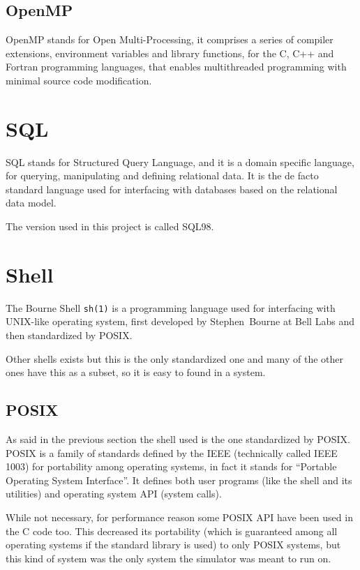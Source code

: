 \documentclass[Lau]{sapthesis} %
\let\oldsection\section
\let\oldsubsection\subsection
\def\subsubsection{\oldsubsection}
\def\subsection{\oldsection}
\def\section{\chapter}
\begin{document}
\subsubsection{OpenMP}

OpenMP stands for Open Multi-Processing, it comprises a series of compiler
extensions, environment variables and library functions, for the C, C++ and
Fortran programming languages, that enables multithreaded programming with
minimal source code modification.

\subsection{SQL}

SQL stands for Structured Query Language, and it is a domain specific language,
for querying, manipulating and defining relational data. It is the de facto
standard language used for interfacing with databases based on the relational
data model.

The version used in this project is called SQL\raisebox{0.04cm}{:}98.

\subsection{Shell}

The Bourne Shell \texttt{sh(1)} is a programming language used for interfacing
with UNIX-like operating system, first developed by Stephen~Bourne at Bell Labs
and then standardized by POSIX.

Other shells exists but this is the only standardized one and many of the other
ones have this as a subset, so it is easy to found in a system.

\subsubsection{POSIX}

As said in the previous section the shell used is the one standardized by POSIX.
POSIX is a family of standards defined by the IEEE (technically called IEEE
1003) for portability among operating systems, in fact it stands for ``Portable
Operating System Interface''. It defines both user programs (like the shell and
its utilities) and operating system API (system calls).

While not necessary, for performance reason some POSIX API have been used in the
C code too. This decreased its portability (which is guaranteed among all
operating systems if the standard library is used) to only POSIX systems, but
this kind of system was the only system the simulator was meant to run on.
\end{document}
